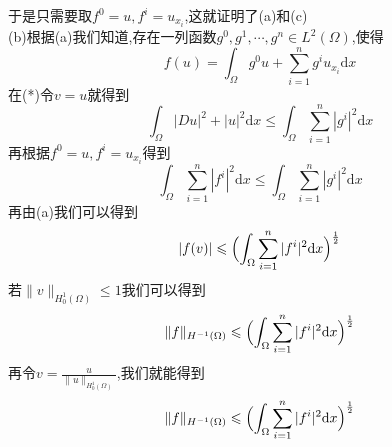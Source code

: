 \documentclass[a4paper,UTF8,12pt]{ctexart}
\begin{document}
于是只需要取$f^0=u,f^i=u_{x_i}$,这就证明了(a)和(c)\\
(b)根据(a)我们知道,存在一列函数$g^0,g^1,\cdots,g^n\in L^2(\Omega)$,使得
$$
f(u) = \int_{\Omega}g^0u+\sum^n_{i=1}g^iu_{x_i}\mathrm{d}x
$$
在(*)令$v=u$就得到
$$
\int_{\Omega}|Du|^2+|u|^2\mathrm{d}x\leqslant\int_{\Omega}\sum^n_{i=1}|g^i|^2\mathrm{d}x
$$
再根据$f^0=u,f^i=u_{x_i}$得到
$$
\int_{\Omega}\sum^n_{i=1}|f^i|^2\mathrm{d}x\leqslant \int_{\Omega}\sum^n_{i=1}|g^i|^2\mathrm{d}x
$$
再由(a)我们可以得到
$$
|f(v)|\leqslant\Bigl(\int_{\Omega}\sum^n_{i=1}|f^i|^2\mathrm{d}x\Bigr)^{\frac{1}{2}}
$$
若$\|v\|_{H^1_0(\Omega)}\leqslant 1$我们可以得到
$$
\|f\|_{H^{-1}(\Omega)}\leqslant\Bigl(\int_{\Omega}\sum^n_{i=1}|f^i|^2\mathrm{d}x\Bigr)^{\frac{1}{2}}
$$
再令$v=\frac{u}{\|u\|_{H^1_0(\Omega)}}$,我们就能得到
$$
\|f\|_{H^{-1}(\Omega)}\leqslant\Bigl(\int_{\Omega}\sum^n_{i=1}|f^i|^2\mathrm{d}x\Bigr)^{\frac{1}{2}}
$$
\end{document}
